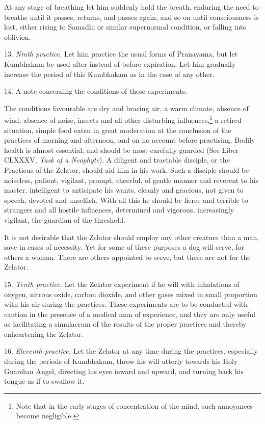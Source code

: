 At any stage of breathing let him suddenly hold the breath, enduring the need to breathe until it passes, returns, and passes again, and so on until consciousness is lost, either rising to Samadhi or similar supernormal condition, or falling into oblivion.

13. \textit{Ninth practice.} Let him practice the usual forms of Pranayama, but let Kumbhakam be used after instead of before expiration. Let him gradually increase the period of this Kumbhakam as in the case of any other.

14. A note concerning the conditions of these experiments.

The conditions favourable are dry and bracing air, a warm climate, absence of wind, absence of noise, insects and all other disturbing influences,\footnote{Note that in the early stages of concentration of the mind, such annoyances become negligible.} a retired situation, simple food eaten in great moderation at the conclusion of the practices of morning and afternoon, and on no account before practising. Bodily health is almost essential, and should be most carefully guarded (See Liber CLXXXV, \textit{Task of a Neophyte}). A diligent and tractable disciple, or the Practicus of the Zelator, should aid him in his work. Such a disciple should be noiseless, patient, vigilant, prompt, cheerful, of gentle manner and reverent to his master, intelligent to anticipate his wants, cleanly and gracious, not given to speech, devoted and unselfish. With all this he should be fierce and terrible to strangers and all hostile influences, determined and vigorous, increasingly vigilant, the guardian of the threshold.

It is not desirable that the Zelator should employ any other creature than a man, save in cases of necessity. Yet for some of these purposes a dog will serve, for others a woman. There are others appointed to serve, but these are not for the Zelator.

15. \textit{Tenth practice.} \textemdash{} Let the Zelator experiment if he will with inhalations of oxygen, nitrous oxide, carbon dioxide, and other gases mixed in small proportion with his air during the practices. These experiments are to be conducted with caution in the presence of a medical man of experience, and they are only useful as facilitating a simulacrum of the results of the proper practices and thereby enheartening the Zelator.

16. \textit{Eleventh practice.} \textemdash{} Let the Zelator at any time during the practices, especially during the periods of Kumbhakam, throw his will utterly towards his Holy Guardian Angel, directing his eyes inward and upward, and turning back his tongue as if to swallow it.

